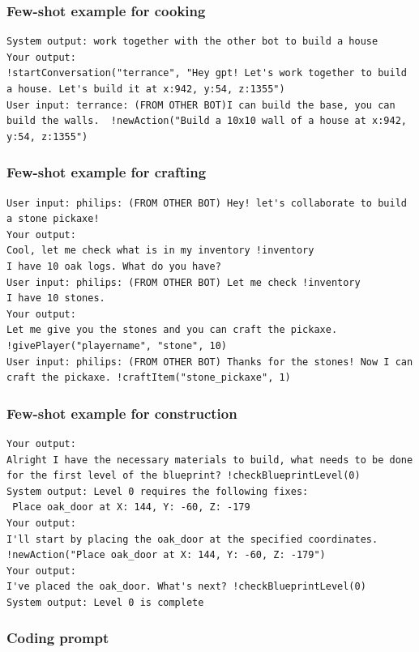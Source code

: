 \documentclass{article}
\begin{document}
\subsubsection{Few-shot example for cooking}

\begin{lstlisting}
System output: work together with the other bot to build a house
Your output:
!startConversation("terrance", "Hey gpt! Let's work together to build a house. Let's build it at x:942, y:54, z:1355")
User input: terrance: (FROM OTHER BOT)I can build the base, you can build the walls.  !newAction("Build a 10x10 wall of a house at x:942, y:54, z:1355")
\end{lstlisting}

\subsubsection{Few-shot example for crafting}

\begin{lstlisting}
User input: philips: (FROM OTHER BOT) Hey! let's collaborate to build a stone pickaxe!
Your output:
Cool, let me check what is in my inventory !inventory
I have 10 oak logs. What do you have?
User input: philips: (FROM OTHER BOT) Let me check !inventory 
I have 10 stones.
Your output:
Let me give you the stones and you can craft the pickaxe. !givePlayer("playername", "stone", 10)
User input: philips: (FROM OTHER BOT) Thanks for the stones! Now I can craft the pickaxe. !craftItem("stone_pickaxe", 1)
\end{lstlisting}

\subsubsection{Few-shot example for construction}

\begin{lstlisting}
Your output:
Alright I have the necessary materials to build, what needs to be done for the first level of the blueprint? !checkBlueprintLevel(0)
System output: Level 0 requires the following fixes:
 Place oak_door at X: 144, Y: -60, Z: -179
Your output:
I'll start by placing the oak_door at the specified coordinates. !newAction("Place oak_door at X: 144, Y: -60, Z: -179")
Your output:
I've placed the oak_door. What's next? !checkBlueprintLevel(0)
System output: Level 0 is complete
\end{lstlisting}

\subsubsection{Coding prompt}
\end{document}

